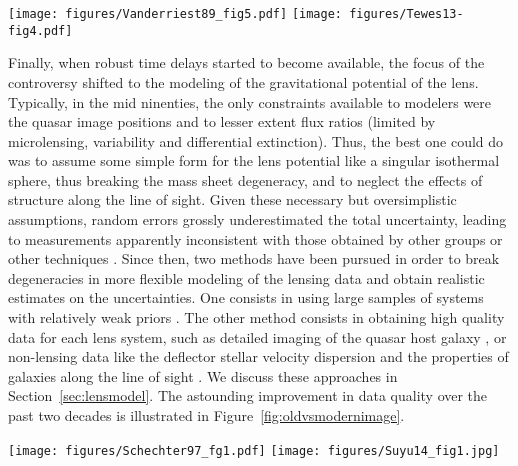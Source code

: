 \begin{figure*}
\texttt{[image: figures/Vanderriest89\_fig5.pdf]}
\texttt{[image: figures/Tewes13-fig4.pdf]}
\caption{Comparison between one of the early light curves (left panel; from \cite{Van89} and a modern light curve from COSMOGRAIL (right panel; from \cite{Tew++13}. Note the improved photometric precision, cadence, and duration of the light curves, allowing for unambiguous determination of the time-delay to within 1-2\% precision.}
\label{fig:oldvsmoderndt}
\end{figure*}

Finally, when robust time delays started to become available, the
focus of the controversy shifted to the modeling of the gravitational
potential of the lens. Typically, in the mid ninenties, the only
constraints available to modelers were the quasar image positions and
to lesser extent flux ratios (limited by microlensing, variability and
differential extinction). Thus, the best one could do was to assume
some simple form for the lens potential like a singular isothermal
sphere, thus breaking the mass sheet degeneracy, and to neglect the
effects of structure along the line of sight. Given these necessary
but oversimplistic assumptions, random errors grossly underestimated
the total uncertainty, leading to measurements apparently inconsistent
with those obtained by other groups or other techniques
\cite{K+S04}. Since then, two methods have been pursued in order to
break degeneracies in more flexible modeling of the lensing data and
obtain realistic estimates on the uncertainties. One consists in using
large samples of systems with relatively weak priors
\cite{Ogu07b}. The other method consists in obtaining high quality data for 
each lens system, such as detailed imaging of the quasar host galaxy
\cite{Keeton:2000p241,WBB04,Suy++06}, or non-lensing data like the deflector 
stellar velocity dispersion \cite{T+K02b} and the properties of
galaxies along the line of sight \cite{K+Z04,Suy++10}. We discuss
these approaches in Section~\ref{sec:lensmodel}. The astounding
improvement in data quality over the past two decades is illustrated
in Figure~\ref{fig:oldvsmodernimage}.

\begin{figure*}
\texttt{[image: figures/Schechter97\_fg1.pdf]}
\texttt{[image: figures/Suyu14\_fig1.jpg]}
\caption{Comparison between imaging data available in the nineties (left panel; from \cite{Sch++97} and in the most recent studies (middle and right panel; from \cite{Suy++14}). With modern data the structure of the quasar host galaxy can be modeled in great detail, providing thousands of constraints on the deflection angle, and thus on the derivatives of the gravitational potential.}
\label{fig:oldvsmodernimage}
\end{figure*}

